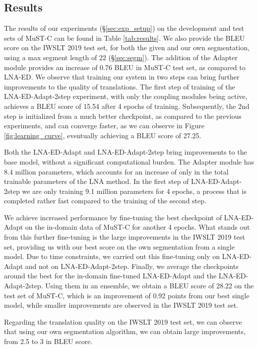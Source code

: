 \documentclass[11pt,a4paper]{article}
\begin{document}
    \subsection{Results}
        \label{sec:results}
        The results of our experiments (\S\ref{sec:exp_setup}) on the development and test sets of MuST-C can be found in Table \ref{tab:results}. We also provide the BLEU score on the IWSLT 2019 test set, for both the given and our own segmentation, using a max segment length of 22 (\S \ref{sec:segm}). The addition of the Adapter module provides an increase of 0.76 BLEU in MuST-C test set, as compared to LNA-ED. We observe that training our system in two steps can bring further improvements to the quality of translations. The first step of training of the LNA-ED-Adapt-2step experiment, with only the coupling modules being active, achieves a BLEU score of 15.54 after 4 epochs of training. Subsequently, the 2nd step is initialized from a much better checkpoint, as compared to the previous experiments, and can converge faster, as we can observe in Figure \ref{fig:learning_curve}, eventually achieving a BLEU score of 27.25.
        
        Both the LNA-ED-Adapt and LNA-ED-Adapt-2step bring improvements to the base model, without a significant computational burden. The Adapter module has 8.4 million parameters, which accounts for an increase of only  in the total trainable parameters of the LNA method. In the first step of LNA-ED-Adapt-2step we are only training 9.1 million parameters for 4 epochs, a process that is completed rather fast compared to the training of the second step.
        
        We achieve increased performance by fine-tuning the best checkpoint of LNA-ED-Adapt on the in-domain data of MuST-C for another 4 epochs. What stands out from this further fine-tuning is the large improvements in the IWSLT 2019 test set, providing us with our best score on the own segmentation from a single model. Due to time constraints, we carried out this fine-tuning only on LNA-ED-Adapt and not on LNA-ED-Adapt-2step. Finally, we average the checkpoints around the best for the in-domain fine-tuned LNA-ED-Adapt and the LNA-ED-Adapt-2step. Using them in an ensemble, we obtain a BLEU score of 28.22 on the test set of MuST-C, which is an improvement of 0.92 points from our best single model, while smaller improvements are observed in the IWSLT 2019 test set.
        
        Regarding the translation quality on the IWSLT 2019 test set, we can observe that using our own segmentation algorithm, we can obtain large improvements, from 2.5 to 3 in BLEU score.
        
\end{document}
